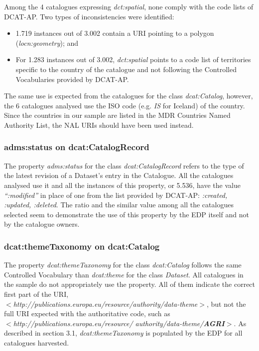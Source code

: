 \documentclass[<options>]{elsarticle}
\begin{document}
Among the 4 catalogues expressing \textit{dct:spatial}, none comply with the code lists of DCAT-AP. Two types of inconsistencies were identified:
\begin{itemize}
\item 1.719 instances out of 3.002 contain a URI pointing to a polygon (\textit{locn:geometry}); and
\item For 1.283 instances out of 3.002, \textit{dct:spatial} points to a code list of territories specific to the country of the catalogue and not following the Controlled Vocabularies provided by DCAT-AP.
% 
% 
\end{itemize}

The same use is expected from the catalogues for the class \textit{dcat:Catalog}, however, the 6 catalogues analysed use the ISO code (e.g. \textit{IS} for Iceland) of the country.  Since the countries in our sample are listed in the MDR Countries Named Authority List, the NAL URIs should have been used instead.

\subsubsection{adms:status on dcat:CatalogRecord}
The property \textit{adms:status }for the class \textit{dcat:CatalogRecord} refers to the type of the latest revision of a Dataset's entry in the Catalogue. All the catalogues analysed use it and all the instances of this property, or 5.536, have the value \textit{“:modified”} in place of one from the list provided by DCAT-AP: \textit{:created, :updated, :deleted}. The ratio and the similar value among all the catalogues selected seem to demonstrate the use of this property by the EDP itself and not by the catalogue owners.

\subsubsection{dcat:themeTaxonomy on dcat:Catalog}

The property \textit{dcat:themeTaxonomy} for the class \textit{dcat:Catalog} follows the same Controlled Vocabulary than \textit{dcat:theme} for the class \textit{Dataset}. All catalogues in the sample do not appropriately use the property. All of them indicate the correct first part of the URI, \\
\textit{$<$http://publications.europa.eu/resource/authority/data-theme$>$}, but not the full URI expected with the authoritative code, such as \\ \textit{$<$http://publications.europa.eu/resource/ authority/data-theme/\textbf{AGRI}$>$}. As described in section 3.1, \textit{dcat:themeTaxonomy} is populated by the EDP for all catalogues harvested.
\end{document}

